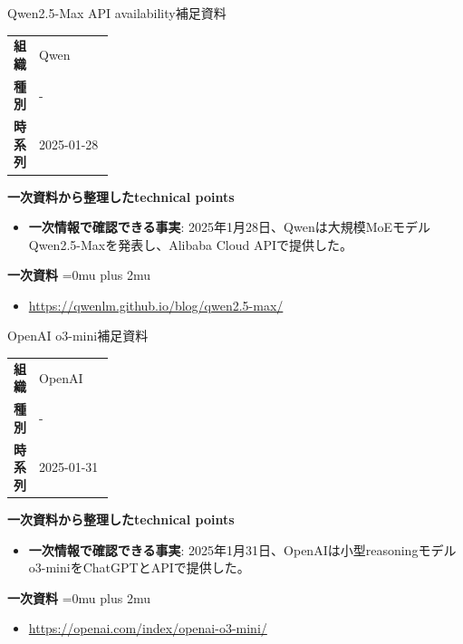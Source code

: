 \begin{technicalnote}{Qwen2.5-Max API availability}{補足資料}
\begingroup
\begin{tabularx}{\linewidth}{@{}>{\bfseries}p{0.22\linewidth}X@{}}
組織 & Qwen \\
種別 & - \\
時系列 & 2025-01-28 \\
\end{tabularx}
\smallskip
{\bfseries 一次資料から整理したtechnical points}
\begin{itemize}[leftmargin=1.5em,itemsep=0.35em]
\item \textbf{一次情報で確認できる事実}: 2025年1月28日、Qwenは大規模MoEモデルQwen2.5-Maxを発表し、Alibaba Cloud APIで提供した。
\end{itemize}
\begin{samepage}
{\bfseries 一次資料}
\begingroup\sloppy
\Urlmuskip=0mu plus 2mu\relax
\begin{itemize}[leftmargin=1.5em,itemsep=0.25em]
\item {\scriptsize\url{https://qwenlm.github.io/blog/qwen2.5-max/}}
\end{itemize}
\endgroup
\end{samepage}
\endgroup
\end{technicalnote}
\medskip

\begin{technicalnote}{OpenAI o3-mini}{補足資料}
\begingroup
\begin{tabularx}{\linewidth}{@{}>{\bfseries}p{0.22\linewidth}X@{}}
組織 & OpenAI \\
種別 & - \\
時系列 & 2025-01-31 \\
\end{tabularx}
\smallskip
{\bfseries 一次資料から整理したtechnical points}
\begin{itemize}[leftmargin=1.5em,itemsep=0.35em]
\item \textbf{一次情報で確認できる事実}: 2025年1月31日、OpenAIは小型reasoningモデルo3-miniをChatGPTとAPIで提供した。
\end{itemize}
\begin{samepage}
{\bfseries 一次資料}
\begingroup\sloppy
\Urlmuskip=0mu plus 2mu\relax
\begin{itemize}[leftmargin=1.5em,itemsep=0.25em]
\item {\scriptsize\url{https://openai.com/index/openai-o3-mini/}}
\end{itemize}
\endgroup
\end{samepage}
\endgroup
\end{technicalnote}
\medskip

